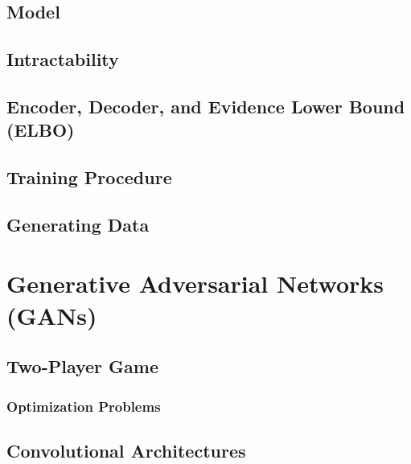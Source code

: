 		\subsection{Model} %

		\subsection{Intractability} %

		\subsection{Encoder, Decoder, and Evidence Lower Bound (ELBO)} %

		\subsection{Training Procedure} %

		\subsection{Generating Data} %

	\section{Generative Adversarial Networks (GANs)} %

		\subsection{Two-Player Game} %

			\subsubsection{Optimization Problems} %

		\subsection{Convolutional Architectures} %

